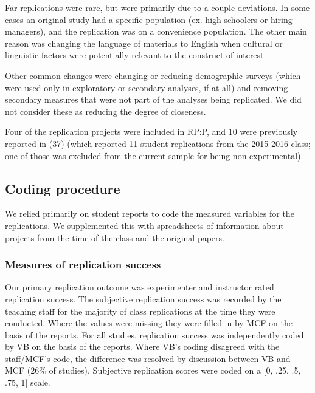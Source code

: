 \documentclass[
  english,
  a4paper,
]{article}
\begin{document}
Far replications were rare, but were primarily due to a couple deviations. In some cases an original study had a specific population (ex. high schoolers or hiring managers), and the replication was on a convenience population. The other main reason was changing the language of materials to English when cultural or linguistic factors were potentially relevant to the construct of interest.

Other common changes were changing or reducing demographic surveys (which were used only in exploratory or secondary analyses, if at all) and removing secondary measures that were not part of the analyses being replicated. We did not consider these as reducing the degree of closeness.

Four of the replication projects were included in RP:P, and 10 were previously reported in (\protect\hyperlink{ref-hawkins2018}{37}) (which reported 11 student replications from the 2015-2016 class; one of those was excluded from the current sample for being non-experimental).

\hypertarget{coding-procedure}{%
\subsection{Coding procedure}\label{coding-procedure}}

We relied primarily on student reports to code the measured variables for the replications. We supplemented this with spreadsheets of information about projects from the time of the class and the original papers.

\hypertarget{measures-of-replication-success}{%
\subsubsection{Measures of replication success}\label{measures-of-replication-success}}

Our primary replication outcome was experimenter and instructor rated replication success. The subjective replication success was recorded by the teaching staff for the majority of class replications at the time they were conducted. Where the values were missing they were filled in by MCF on the basis of the reports. For all studies, replication success was independently coded by VB on the basis of the reports. Where VB's coding disagreed with the staff/MCF's code, the difference was resolved by discussion between VB and MCF (26\% of studies). Subjective replication scores were coded on a {[}0, .25, .5, .75, 1{]} scale.
\end{document}
